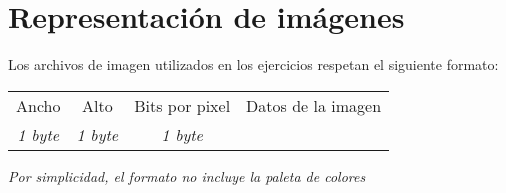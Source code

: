 \documentclass[12pt]{article}
\begin{document}
\section*{Representación de imágenes}
\label{sec_imagenes}

Los archivos de imagen utilizados en los ejercicios respetan el siguiente
formato:

\begin{tabular}[t]{|c|c|c||c|}

    \hline

    Ancho&Alto& Bits por pixel & Datos de la imagen\\

    \emph{1 byte}& \emph{1 byte}& \emph{1 byte}&\\

    \hline

\end{tabular}

\emph{Por simplicidad, el formato no incluye la paleta de colores}
\end{document}
